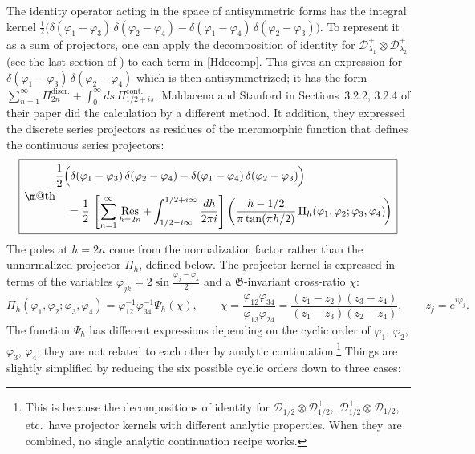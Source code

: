 \documentclass[12pt]{article}
\makeatletter
\newcommand*{\wideboxed}[1]{\setlength{\fboxsep}{1ex}%
  \fbox{\m@th$\displaystyle#1$}}
\newcommand{\calD}{\mathcal{D}}
\DeclareMathOperator{\Ress}{Res}
\newcommand{\GG}{\mathfrak{G}}
\newcommand{\vp}{\varphi}
\makeatother
\begin{document}
The identity operator acting in the space of antisymmetric forms has the integral kernel $\frac{1}{2}\bigl(\delta(\vp_1-\vp_3)\,\delta(\vp_2-\vp_4) -\delta(\vp_1-\vp_4)\,\delta(\vp_2-\vp_3)\bigr)$. To represent it as a sum of projectors, one can apply the decomposition of identity for $\calD^{\pm}_{\lambda_1}\otimes\calD^{\pm}_{\lambda_2}$ (see the last section of \cite{SL2R}) to each term in \eqref{Hdecomp}. This gives an expression for $\delta(\vp_1-\vp_3)\,\delta(\vp_2-\vp_4)$ which is then antisymmetrized; it has the form $\sum_{n=1}^{\infty}\Pi^{\text{discr.}}_{2n} +\int_{0}^{\infty}ds\,\Pi^{\text{cont.}}_{1/2+is}$. Maldacena and Stanford in Sections~3.2.2, 3.2.4 of their paper \cite{MS16} did the calculation by a different method. It addition, they expressed the discrete series projectors as residues of the meromorphic function that defines the continuous series projectors:
\begin{equation}\label{decomp_id}
\wideboxed{
\begin{aligned}
&\frac{1}{2}\Bigl(\delta(\vp_1-\vp_3)\,\delta(\vp_2-\vp_4) -\delta(\vp_1-\vp_4)\,\delta(\vp_2-\vp_3)\Bigr)\\[3pt]
&\quad=\frac{1}{2}\,\left[\sum_{n=1}^{\infty}\Ress_{h=2n}
+\int_{1/2-i\infty}^{1/2+i\infty}\frac{dh}{2\pi i}\right]
\biggl(\frac{h-1/2}{\pi\tan(\pi h/2)}\,\Pi_h(\vp_1,\vp_2;\vp_3,\vp_4)\!\biggr)
\end{aligned}
}
\end{equation}
The poles at $h=2n$ come from the normalization factor rather than the unnormalized projector $\Pi_h$, defined below. The projector kernel is expressed in terms of the variables $\vp_{jk}=2\sin\frac{\vp_j-\vp_k}{2}$ and a $\GG$-invariant cross-ratio $\chi$:
\begin{equation}
\Pi_h(\vp_1,\vp_2;\vp_3,\vp_4)=\vp_{12}^{-1}\vp_{34}^{-1}\Psi_{h}(\chi),\qquad
\chi=\frac{\vp_{12}\vp_{34}}{\vp_{13}\vp_{24}}
=\frac{(z_1-z_2)(z_3-z_4)}{(z_1-z_3)(z_2-z_4)},\qquad
z_j=e^{i\vp_j}.
\end{equation}
The function $\Psi_h$ has different expressions depending on the cyclic order of $\vp_1$, $\vp_2$, $\vp_3$, $\vp_4$; they are not related to each other by analytic continuation.\footnote{This is because the decompositions of identity for $\calD^{+}_{1/2}\otimes\calD^{+}_{1/2}$,\, $\calD^{+}_{1/2}\otimes\calD^{-}_{1/2}$, etc.\ have projector kernels with different analytic properties. When they are combined, no single analytic continuation recipe works.} Things are slightly simplified by reducing the six possible cyclic orders down to three cases:
\end{document}
